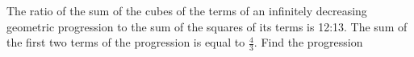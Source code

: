 
%
%
%
%
% 
% 

\question The ratio of the sum of the cubes of the terms of an infinitely decreasing 
geometric progression to the sum of the squares of its terms is 12:13. The sum of the 
first two terms of the progression is equal to $\frac{4}{3}$. Find the progression

\insertQR{}

\ifprintanswers
\fi 

